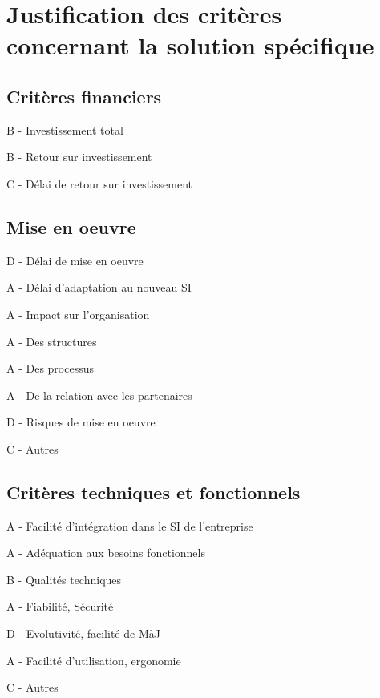 \section{Justification des critères concernant la solution spécifique}

\subsection{Critères financiers}

B - Investissement total

B - Retour sur investissement

C - Délai de retour sur investissement

\subsection{Mise en oeuvre}

D - Délai de mise en oeuvre

A - Délai d'adaptation au nouveau SI

A - Impact sur l'organisation

	A - Des structures

	A - Des processus

	A - De la relation avec les partenaires

D - Risques de mise en oeuvre

C - Autres

\subsection{Critères techniques et fonctionnels}

A - Facilité d'intégration dans le SI de l'entreprise

A - Adéquation aux besoins fonctionnels

B - Qualités techniques

	A - Fiabilité, Sécurité

	D - Evolutivité, facilité de MàJ

	A - Facilité d'utilisation, ergonomie

C - Autres

